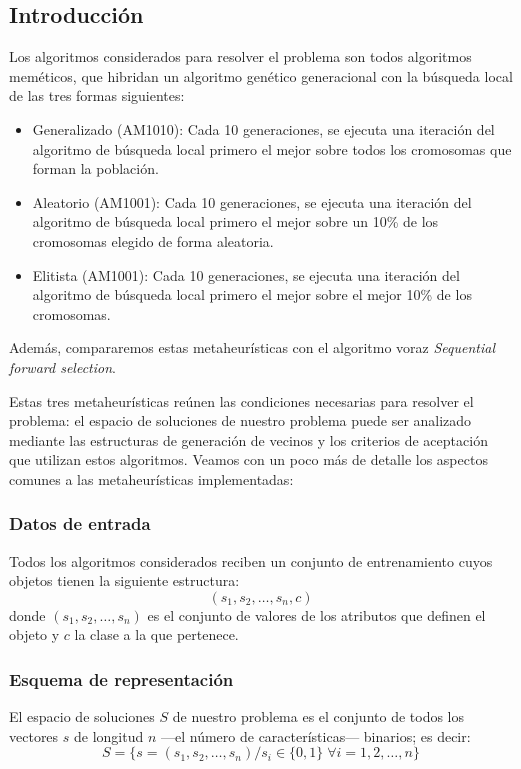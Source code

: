 \documentclass[a4paper, 11pt, titlepage]{article}
\begin{document}
    \subsection{Introducción}

    Los algoritmos considerados para resolver el problema son todos algoritmos meméticos, que hibridan un algoritmo genético generacional con la búsqueda local de las tres formas siguientes:
    \begin{itemize}
        \item Generalizado (AM1010): Cada 10 generaciones, se ejecuta una iteración del algoritmo de búsqueda local primero el mejor sobre todos los cromosomas que forman la población.
        \item Aleatorio (AM1001): Cada 10 generaciones, se ejecuta una iteración del algoritmo de búsqueda local primero el mejor sobre un 10\% de los cromosomas elegido de forma aleatoria.
        \item Elitista (AM1001): Cada 10 generaciones, se ejecuta una iteración del algoritmo de búsqueda local primero el mejor sobre el mejor 10\% de los cromosomas.
    \end{itemize}

    Además, compararemos estas metaheurísticas con el algoritmo voraz \emph{Sequential forward selection}.

    Estas tres metaheurísticas reúnen las condiciones necesarias para resolver el problema: el espacio de soluciones de nuestro problema puede ser analizado mediante las estructuras de generación de vecinos y los criterios de aceptación que utilizan estos algoritmos. Veamos con un poco más de detalle los aspectos comunes a las metaheurísticas implementadas:

    \subsubsection*{Datos de entrada}
    Todos los algoritmos considerados reciben un conjunto de entrenamiento cuyos objetos tienen la siguiente estructura:
    \[
    (s_1, s_2, \dots, s_n, c)
    \]
    donde $(s_1, s_2, \dots, s_n)$ es el conjunto de valores de los atributos que definen el objeto y $c$ la clase a la que pertenece.

    \subsubsection*{Esquema de representación}
    El espacio de soluciones $S$ de nuestro problema es el conjunto de todos los vectores $s$ de longitud $n$ ---el número de características--- binarios; es decir:
    \[
    S = \{s = (s_1, s_2, \dots, s_n) / s_i \in \{0,1\} \;\forall i = 1, 2, \dots, n\}
    \]
\end{document}

